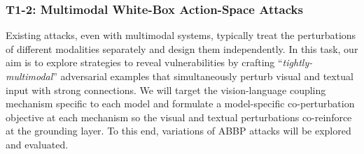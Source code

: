 \documentclass[11pt,letterpaper]{article}
\begin{document}







\subsubsection{T1-2: Multimodal White-Box Action-Space Attacks}  \label{sec:t1_2}

Existing attacks, even with multimodal systems, typically treat the perturbations of different modalities separately and design them independently. 
{In this task, our aim is to explore strategies to reveal vulnerabilities by crafting ``\textit{tightly-multimodal}'' adversarial examples that simultaneously perturb visual and textual input with strong connections.} 
We will target the vision-language coupling mechanism specific to each model and formulate a model-specific co-perturbation objective at each mechanism so the visual and textual perturbations co-reinforce at the grounding layer. 
To this end, variations of ABBP attacks will be explored and evaluated.
\end{document}
